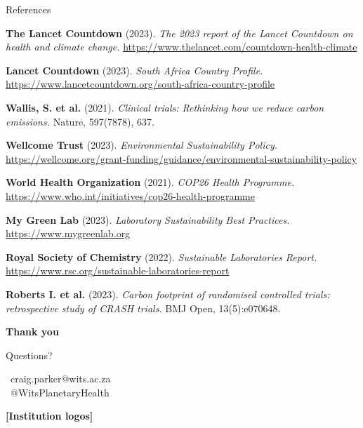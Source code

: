\documentclass{beamer}
\begin{document}
\begin{frame}[allowframebreaks]{References}
\begin{thebibliography}{99}
\textbf{The Lancet Countdown} (2023).
\textit{The 2023 report of the Lancet Countdown on health and climate change.}
\url{https://www.thelancet.com/countdown-health-climate}

\textbf{Lancet Countdown} (2023).
\textit{South Africa Country Profile.}
\url{https://www.lancetcountdown.org/south-africa-country-profile}

\textbf{Wallis, S. et al.} (2021).
\textit{Clinical trials: Rethinking how we reduce carbon emissions.}
Nature, 597(7878), 637.

\textbf{Wellcome Trust} (2023).
\textit{Environmental Sustainability Policy.}
\url{https://wellcome.org/grant-funding/guidance/environmental-sustainability-policy}

\textbf{World Health Organization} (2021).
\textit{COP26 Health Programme.}
\url{https://www.who.int/initiatives/cop26-health-programme}

\textbf{My Green Lab} (2023).
\textit{Laboratory Sustainability Best Practices.}
\url{https://www.mygreenlab.org}

\textbf{Royal Society of Chemistry} (2022).
\textit{Sustainable Laboratories Report.}
\url{https://www.rsc.org/sustainable-laboratories-report}

\textbf{Roberts I. et al.} (2023).
\textit{Carbon footprint of randomised controlled trials: retrospective study of CRASH trials.}
BMJ Open, 13(5):e070648.
\end{thebibliography}
\end{frame}

\begin{frame}[plain]
\begin{center}
\vspace{1cm}
{\Large\textbf{Thank you}}

\vspace{0.5cm}
{\large Questions?}

\vspace{1cm}
\faEnvelope\ craig.parker@wits.ac.za\\
\faTwitter\ @WitsPlanetaryHealth
\end{center}

\begin{center}
\vspace{1cm}
\textbf{[Institution logos]}
\end{center}
\end{frame}
\end{document}
